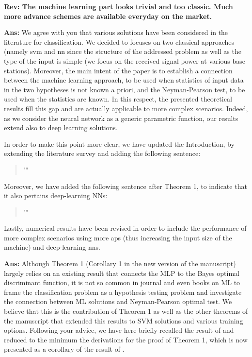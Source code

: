 \documentclass[draftcls,onecolumn,12pt]{IEEEtran}
\newcounter{revc}
\newcommand{\revp}[1]{\zref[revcontent]{#1}}
\begin{document}
\vspace{5mm} %
\begin{framed}
{\bf Rev: The machine learning part looks trivial and too classic. Much more advance schemes are available everyday on the market.}
\end{framed}
 

{\bf Ans:} We agree with you that various solutions have been considered in the literature for classification. We decided to focuses on two classical approaches (namely \ac{svm} and \ac{nn} since the structure of the addressed problem as well as the type of the input is simple (we focus on the received signal power at various base stations). Moreover, the main intent of the paper is to establish a connection between the machine learning approach, to be used when statistics of input data in the two hypotheses is not known a priori, and the Neyman-Pearson test, to be used when the statistics are known. In this respect, the presented theoretical results fill this gap and are actually applicable to more complex scenarios. Indeed, as we consider the neural network as a generic parametric function, %
our results extend also to deep learning solutions.

In order to make this point more clear, we have updated the Introduction, by extending the literature survey and adding the following sentence:
\begin{quote}
    "\revp{rev11a}"
\end{quote}

Moreover, we have added the following sentence after Theorem 1, to indicate that it also pertains deep-learning NNs:
\begin{quote}
    "\revp{rev11b}"
\end{quote}
 
Lastly, numerical results have been revised in order to include the performance of more complex scenarios using more \acp{ap} (thus increasing the input size of the machine) and deep-learning \acp{nn}. 

\vspace{5mm} %
\begin{framed}
\end{framed}

{\bf Ans:} Although Theorem 1 (Corollary 1 in the new version of the manuscript) largely relies on an existing result that connects the MLP to the Bayes optimal discriminant function, it is not so common in journal and even books on ML to frame the classification problem as a hypothesis testing problem and investigate the connection between ML solutions and Neyman-Pearson optimal test. We believe that this is the contribution of Theorem 1 as well as the other theorems of the manuscript that extended this results to SVM solutions and various training options. Following your advice, we have here briefly recalled the result of \cite{Ruck-90} and reduced to the minimum the derivations for the proof of Theorem 1, which is now presented as a corollary of the result of \cite{Ruck-90}.
\end{document}
